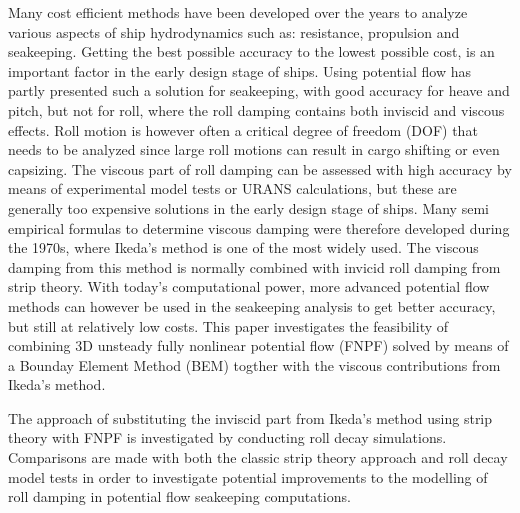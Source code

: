 Many cost efficient methods have been developed over the years to analyze various aspects of ship hydrodynamics such as: resistance, propulsion and seakeeping. Getting the best possible accuracy to the lowest possible cost, is an important factor in the early design stage of ships. Using potential flow has partly presented such a solution for seakeeping, with good accuracy for heave and pitch, but not for roll, where the roll damping contains both inviscid and viscous effects. Roll motion is however often a critical degree of freedom (DOF) that needs to be analyzed since large roll motions can result in cargo shifting or even capsizing. 
The viscous part of roll damping can be assessed with high accuracy by means of experimental model tests or URANS calculations, but these are generally too expensive solutions in the early design stage of ships. Many semi empirical formulas to determine viscous damping were therefore developed during the 1970s, where Ikeda's method is one of the most widely used.
The viscous damping from this method is normally combined with invicid roll damping from strip theory. With today's computational power, more advanced potential flow methods can however be used in the seakeeping analysis to get better accuracy, but still at relatively low costs. 
This paper investigates the feasibility of combining 3D unsteady fully nonlinear potential flow (FNPF) solved by means of a Bounday Element Method (BEM) togther with the viscous contributions from Ikeda's method.

The approach of substituting the inviscid part from Ikeda's method using strip theory with FNPF is investigated by conducting roll decay simulations. Comparisons are made with both the classic strip theory approach and roll decay model tests in order to investigate potential improvements to the modelling of roll damping in potential flow seakeeping computations.

 




